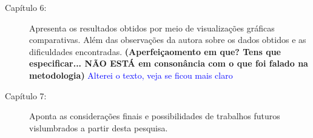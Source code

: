 \begin{description}
\item[Capítulo 6:] Apresenta os resultados obtidos por meio de visualizações gráficas comparativas. Além das observações da autora sobre os dados obtidos e as dificuldades encontradas. \textbf{(Aperfeiçaomento em que? Tens que especificar... NÃO ESTÁ em consonância com o que foi falado na metodologia)} \textcolor{blue}{Alterei o texto, veja se ficou mais claro}

\item[Capítulo 7:] Aponta as considerações finais e possibilidades de trabalhos futuros vislumbrados a partir desta pesquisa. 
\end{description}

